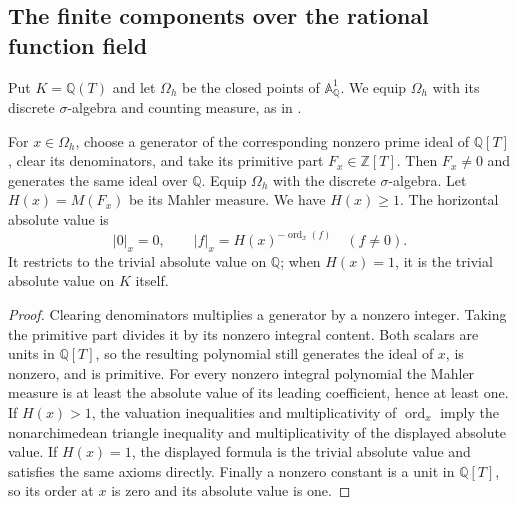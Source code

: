 \subsection{The finite components over the rational function field}

Put $K=\mathbb Q(T)$ and let $\Omega_h$ be the closed points of
$\mathbb A^1_{\mathbb Q}$. We equip $\Omega_h$ with its discrete
$\sigma$-algebra and counting measure, as in
\cite[\S3.2.5]{chen-moriwaki}.

\begin{definition}
\label{def:rational-horizontal-place}
\leanok
For $x\in\Omega_h$, choose a generator of the corresponding nonzero prime
ideal of $\mathbb Q[T]$, clear its denominators, and take its primitive
part $F_x\in\mathbb Z[T]$. Then $F_x\ne0$ and generates the same ideal
over $\mathbb Q$. Equip $\Omega_h$ with the discrete $\sigma$-algebra.
Let $H(x)=M(F_x)$ be its Mahler measure. We have $H(x)\geq1$.
The horizontal absolute value is
\[
 |0|_x=0,\qquad |f|_x=H(x)^{-\operatorname{ord}_x(f)}\quad(f\ne0).
\]
It restricts to the trivial absolute value on $\mathbb Q$; when
$H(x)=1$, it is the trivial absolute value on $K$ itself.
\end{definition}
\begin{proof}
Clearing denominators multiplies a generator by a nonzero integer.
Taking the primitive part divides it by its nonzero integral content.
Both scalars are units in $\mathbb Q[T]$, so the resulting polynomial
still generates the ideal of $x$, is nonzero, and is primitive.
For every nonzero integral polynomial the Mahler measure is at least
the absolute value of its leading coefficient, hence at least one.
If $H(x)>1$, the valuation inequalities and multiplicativity of
$\operatorname{ord}_x$ imply the nonarchimedean triangle inequality and
multiplicativity of the displayed absolute value. If $H(x)=1$, the
displayed formula is the trivial absolute value and satisfies the same
axioms directly. Finally a nonzero constant is a unit in
$\mathbb Q[T]$, so its order at $x$ is zero and its absolute value is one.
\end{proof}

